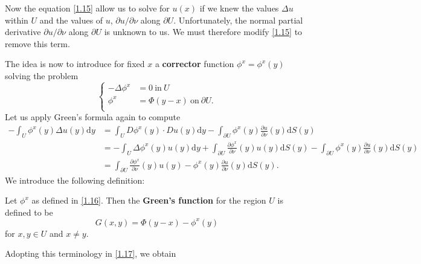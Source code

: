 Now the equation \eqref{1.15} allow us to solve for $u(x)$ if we knew the values $\Delta u$ within $U$ and the values of $u$, $\partial u/\partial\nu$ along $\partial U$. Unfortunately, the normal partial derivative $\partial u/\partial\nu$ along $\partial U$ is unknown to us. We must therefore modify \eqref{1.15} to remove this term.\par
The idea is now to introduce for fixed $x$ a \textbf{corrector} function $\phi^x=\phi^x(y)$ solving the problem 
\begin{equation}\label{1.16}
\left\{ \begin{aligned}
	-\Delta \phi^x&=0\ \text{in}\ U\\
	\phi^x&=\Phi(y-x)\ \text{on}\ \partial U.\\
\end{aligned} \right. 
\end{equation}
Let us apply Green's formula again to compute 
\begin{equation}\label{1.17}
\begin{aligned}
-\int_U{\phi ^x\left( y \right) \Delta u\left( y \right) \mathrm{d}y}&=\int_U{D\phi ^x\left( y \right) \cdot Du\left( y \right) \mathrm{d}y}-\int_{\partial U}{\phi ^x\left( y \right) \frac{\partial u}{\partial \nu}\left( y \right) \mathrm{d}S\left( y \right)}
\\
&=-\int_U{\Delta \phi ^x\left( y \right) u\left( y \right) \mathrm{d}y}+\int_{\partial U}{\frac{\partial \phi ^x}{\partial \nu}\left( y \right) u\left( y \right) \mathrm{d}S\left( y \right)}-\int_{\partial U}{\phi ^x\left( y \right) \frac{\partial u}{\partial \nu}\left( y \right) \mathrm{d}S\left( y \right)}
\\
&=\int_{\partial U}{\frac{\partial \phi ^x}{\partial \nu}\left( y \right) u\left( y \right) -\phi ^x\left( y \right) \frac{\partial u}{\partial \nu}\left( y \right) \mathrm{d}S\left( y \right)}.
\end{aligned}
\end{equation}
We introduce the following definition:  
\begin{definition}
Let $\phi^x$ as defined in \eqref{1.16}. Then the \textbf{Green's function} for the region $U$ is defined to be 
$$G(x,y)=\Phi(y-x)-\phi^x(y)$$
for $x,y\in U$ and $x\ne y$.
\end{definition}
Adopting this terminology in \eqref{1.17}, we obtain 
